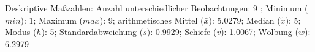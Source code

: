 				\label{tableValues:bsch14b}
				\vspace*{-\baselineskip}
                    \begin{noten}
                	    \note{} Deskriptive Maßzahlen:
                	    Anzahl unterschiedlicher Beobachtungen: 9%
                	    ; 
                	      Minimum ($min$): 1; 
                	      Maximum ($max$): 9; 
                	      arithmetisches Mittel ($\bar{x}$): \num[round-mode=places,round-precision=2]{5.0279}; 
                	      Median ($\tilde{x}$): 5; 
                	      Modus ($h$): 5; 
                	      Standardabweichung ($s$): \num[round-mode=places,round-precision=2]{0.9929}; 
                	      Schiefe ($v$): \num[round-mode=places,round-precision=2]{1.0067}; 
                	      Wölbung ($w$): \num[round-mode=places,round-precision=2]{6.2979}
                     \end{noten}


